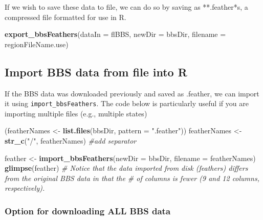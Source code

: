 \documentclass[12pt,twoside,openany]{reedthesis}
\newenvironment{Shaded}{\begin{snugshade}}{\end{snugshade}}
\newcommand{\CommentTok}[1]{\textcolor[rgb]{0.56,0.35,0.01}{\textit{#1}}}
\newcommand{\DataTypeTok}[1]{\textcolor[rgb]{0.13,0.29,0.53}{#1}}
\newcommand{\KeywordTok}[1]{\textcolor[rgb]{0.13,0.29,0.53}{\textbf{#1}}}
\newcommand{\NormalTok}[1]{#1}
\newcommand{\StringTok}[1]{\textcolor[rgb]{0.31,0.60,0.02}{#1}}
\begin{document}
If we wish to save these data to file, we can do so by saving as **.feather*s, a compressed file formatted for use in R.
\begin{Shaded}
\begin{Highlighting}[]
\KeywordTok{export_bbsFeathers}\NormalTok{(}\DataTypeTok{dataIn =}\NormalTok{ flBBS,}
                \DataTypeTok{newDir  =}\NormalTok{ bbsDir,}
                \DataTypeTok{filename =}\NormalTok{ regionFileName.use)}
\end{Highlighting}
\end{Shaded}
\hypertarget{import-bbs-data-from-file-into-r}{%
\subsection{Import BBS data from file into R}\label{import-bbs-data-from-file-into-r}}

If the BBS data was downloaded previously and saved as .feather, we can import it using \texttt{import\_bbsFeathers}. The code below is particularly useful if you are importing multiple files (e.g., multiple states)
\begin{Shaded}
\begin{Highlighting}[]
\NormalTok{(featherNames <-}\StringTok{ }\KeywordTok{list.files}\NormalTok{(bbsDir, }\DataTypeTok{pattern =} \StringTok{".feather"}\NormalTok{))}
\NormalTok{featherNames <-}\StringTok{ }\KeywordTok{str_c}\NormalTok{(}\StringTok{"/"}\NormalTok{, featherNames) }\CommentTok{#add separator}

\NormalTok{feather <-}\StringTok{ }\KeywordTok{import_bbsFeathers}\NormalTok{(}\DataTypeTok{newDir  =}\NormalTok{ bbsDir,}
                              \DataTypeTok{filename =}\NormalTok{ featherNames)}
\KeywordTok{glimpse}\NormalTok{(feather) }\CommentTok{# Notice that the data imported from disk (feathers) differs from the original BBS data in that the # of columns is fewer (9 and 12 columns, respectively).}
\end{Highlighting}
\end{Shaded}
\hypertarget{option-for-downloading-all-bbs-data}{%
\subsubsection{Option for downloading ALL BBS data}\label{option-for-downloading-all-bbs-data}}
\end{document}
